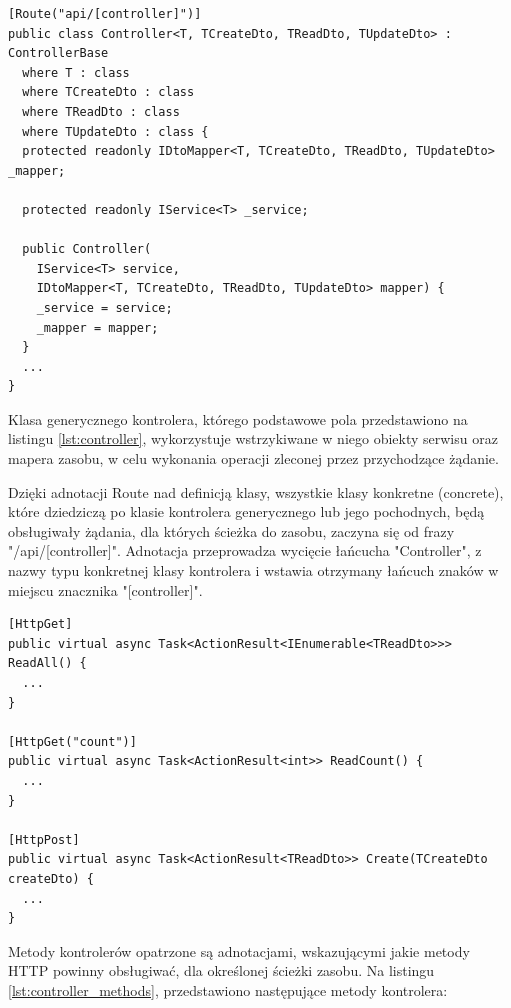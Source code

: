 \begin{lstlisting}[language=CSharp, caption={Generyczna klasa kontrolera, bazująca na klasach zasobu oraz klasach jego reprezentacji}, label=lst:controller]
[Route("api/[controller]")]
public class Controller<T, TCreateDto, TReadDto, TUpdateDto> : ControllerBase
  where T : class
  where TCreateDto : class
  where TReadDto : class
  where TUpdateDto : class {
  protected readonly IDtoMapper<T, TCreateDto, TReadDto, TUpdateDto> _mapper;

  protected readonly IService<T> _service;

  public Controller(
    IService<T> service,
    IDtoMapper<T, TCreateDto, TReadDto, TUpdateDto> mapper) {
    _service = service;
    _mapper = mapper;
  }
  ...
}
\end{lstlisting}

Klasa generycznego kontrolera, którego podstawowe pola przedstawiono na listingu \ref{lst:controller}, wykorzystuje wstrzykiwane w niego obiekty serwisu oraz mapera zasobu, w celu wykonania operacji zleconej przez przychodzące żądanie. 

Dzięki adnotacji Route nad definicją klasy, wszystkie klasy konkretne (concrete), które dziedziczą po klasie kontrolera generycznego lub jego pochodnych, będą obsługiwały żądania, dla których ścieżka do zasobu, zaczyna się od frazy "/api/[controller]". Adnotacja przeprowadza wycięcie łańcucha "Controller", z nazwy typu konkretnej klasy kontrolera i wstawia otrzymany łańcuch znaków w miejscu znacznika "[controller]".

\begin{lstlisting}[language=CSharp, caption={Publiczne metody klasy generycznej kontrolera}, label=lst:controller_methods]
[HttpGet]
public virtual async Task<ActionResult<IEnumerable<TReadDto>>> ReadAll() {
  ...
}

[HttpGet("count")]
public virtual async Task<ActionResult<int>> ReadCount() {
  ...
}

[HttpPost]
public virtual async Task<ActionResult<TReadDto>> Create(TCreateDto createDto) {
  ...
}
\end{lstlisting}

Metody kontrolerów opatrzone są adnotacjami, wskazującymi jakie metody HTTP powinny obsługiwać, dla określonej ścieżki zasobu. Na listingu \ref{lst:controller_methods}, przedstawiono następujące metody kontrolera:

